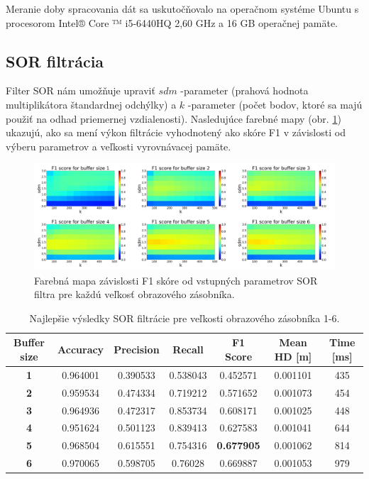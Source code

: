 Meranie doby spracovania dát sa uskutočňovalo na operačnom systéme Ubuntu s procesorom Intel® Core ™ i5-6440HQ 2,60 GHz a 16 GB operačnej pamäte. 

\subsection{SOR filtrácia}

Filter SOR nám umožňuje upraviť $sdm$ -parameter (prahová hodnota multiplikátora štandardnej odchýlky) a $k$ -parameter (počet bodov, ktoré sa majú použiť na odhad priemernej vzdialenosti). Nasledujúce farebné mapy (obr. \ref{fig:sorf1}) ukazujú, ako sa mení výkon filtrácie vyhodnotený ako skóre F1 v závislosti od výberu parametrov a veľkosti vyrovnávacej pamäte.

\begin{figure}[h]
	\centering
	\includegraphics[width=\textwidth]{figures/sor_f1.png}
	\caption{Farebná mapa závislosti F1 skóre od vstupných parametrov SOR filtra pre každú veľkosť obrazového zásobníka.}
	\label{fig:sorf1}
\end{figure}

\begin{table}[h]
	\centering
	\caption{\label{tab:sor_best} Najlepšie výsledky SOR filtrácie pre veľkosti obrazového zásobníka 1-6. }
	\begin{tabular}{ccccccc}
		\toprule
		\textbf{Buffer size} & \textbf{Accuracy} & \textbf{Precision} & \textbf{Recall} & \textbf{F1 Score} & \textbf{Mean HD [m]} & \textbf{Time [ms]} \\ 
		\midrule
		\textbf{1}           & 0.964001          & 0.390533           & 0.538043        & 0.452571          & 0.001101          & 435           \\ 
		\textbf{2}           & 0.959534          & 0.474334           & 0.719212        & 0.571652          & 0.001073          & 454           \\ 
		\textbf{3}           & 0.964936          & 0.472317           & 0.853734        & 0.608171          & 0.001025          & 448           \\ 
		\textbf{4}           & 0.951624          & 0.501123           & 0.839413        & 0.627583          & 0.001041          & 644           \\ 
		\textbf{5}           & 0.968504          & 0.615551           & 0.754316        & \textbf{0.677905}          & 0.001062 & 814           \\ 
		\textbf{6}           & 0.970065          & 0.598705           & 0.76028         & 0.669887          & 0.001053          & 979           \\ 
		\bottomrule
	\end{tabular}
\end{table}

